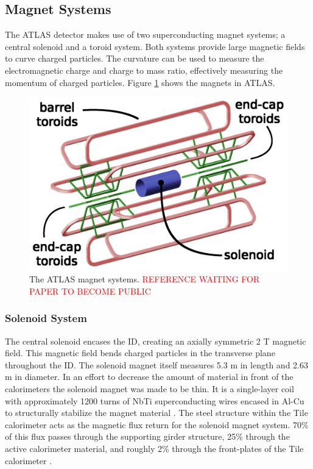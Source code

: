 	\subsection{Magnet Systems}\label{ssec:magnets}
	The \gls{ATLAS} detector makes use of two superconducting magnet systems; a central solenoid and a toroid system. Both systems provide large magnetic fields to curve charged particles. The curvature can be used to measure the electromagnetic charge and charge to mass ratio, effectively measuring the momentum of charged particles. Figure \ref{fig:ATLAS-magnets} shows the magnets in \gls{ATLAS}.

	\begin{figure}[!ht]
	\centering
	\includegraphics[width=.65\textwidth,keepaspectratio=true]{chapters/chapter3_experiment/images/magnetSystems.png}
	\caption{ The ATLAS magnet systems. \textcolor{red}{REFERENCE WAITING FOR PAPER TO BECOME PUBLIC}}
	\label{fig:ATLAS-magnets}
	\end{figure}

	\subsubsection{Solenoid System}\label{sssec:solenoid}
		The central solenoid encases the \gls{ID}, creating an axially symmetric 2 T magnetic field. This magnetic field bends charged particles in the transverse plane throughout the \gls{ID}. The solenoid magnet itself measures 5.3 m in length and 2.63 m in diameter. In an effort to decrease the amount of material in front of the calorimeters the solenoid magnet was made to be thin. It is a single-layer coil with approximately 1200 turns of NbTi superconducting wires encased in Al-Cu to structurally stabilize the magnet material \cite{atlas-solenoid}. The steel structure within the Tile calorimeter acts as the magnetic flux return for the solenoid magnet system. 70\% of this flux passes through the supporting girder structure, 25\% through the active calorimeter material, and roughly 2\% through the front-plates of the Tile calorimeter \cite{ATLAS-tile}.

